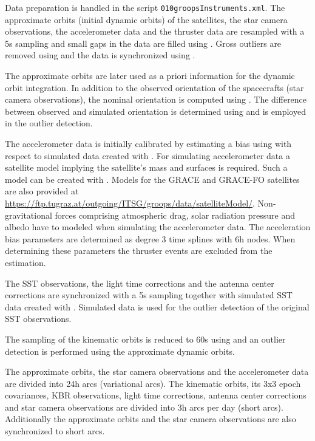 Data preparation is handled in the script \verb|010groopsInstruments.xml|. The approximate orbits (initial dynamic orbits)
of the satellites, the star camera observations, the accelerometer data and the thruster data are resampled with a 5s sampling
and small gaps in the data are filled using . Gross outliers are removed using 
and the data is synchronized using  .

The approximate orbits are later used as a priori information for the dynamic orbit integration.
In addition to the observed orientation of the spacecrafts (star camera observations),
the nominal orientation is computed using . The difference between
observed and simulated orientation is determined using 
and is employed in the outlier detection.

The accelerometer data is initially calibrated by estimating a bias using
 with respect to simulated data created
with . For simulating accelerometer data a satellite model
implying the satellite's mass and surfaces is required. Such a model can be created with
. Models for the GRACE and GRACE-FO satellites are also provided
at \url{https://ftp.tugraz.at/outgoing/ITSG/groops/data/satelliteModel/}. Non-gravitational forces
comprising atmospheric drag, solar radiation pressure and albedo have to modeled when simulating
the accelerometer data. The acceleration bias parameters are determined as degree 3 time splines
with 6h nodes. When determining these parameters the thruster events are excluded from the estimation.

The SST observations, the light time corrections and the antenna center corrections are synchronized
with a 5s sampling together with simulated SST data created with .
Simulated data is used for the outlier detection of the original SST observations.

The sampling of the kinematic orbits is reduced to 60s using  and
an outlier detection is performed using the approximate dynamic orbits.

The approximate orbits, the star camera observations and the accelerometer data are divided into 24h arcs
(variational arcs). The kinematic orbits, its 3x3 epoch covariances, KBR observations,
light time corrections, antenna center corrections and star camera observations are divided into 3h arcs
per day (short arcs). Additionally the approximate orbits and the star camera observations are also
synchronized to short arcs.

